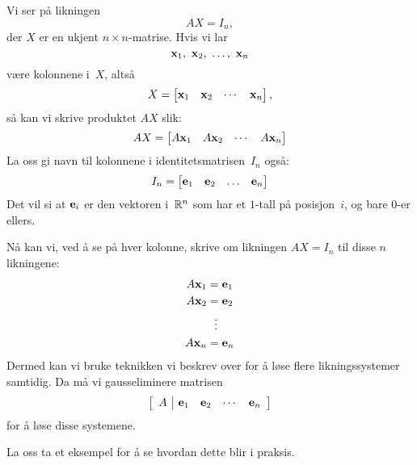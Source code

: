 Vi ser på likningen
\[
AX = I_n,
\]
der $X$ er en ukjent $n \times n$-matrise.  Hvis vi lar
\[
\V{x}_1,\ \V{x}_2,\ \ldots,\ \V{x}_n
\]
være kolonnene i~$X$, altså
\[
X = \begin{bmatrix} \mathbf{x}_1 & \mathbf{x}_2 & \cdots & \mathbf{x}_n \end{bmatrix},
\]
så kan vi skrive produktet $AX$ slik:
\[
AX = \begin{bmatrix} A \mathbf{x}_1 & A \mathbf{x}_2 & \cdots & A \mathbf{x}_n \end{bmatrix}
\]
La oss gi navn til kolonnene i identitetsmatrisen~$I_n$ også:
\[
I_n = \begin{bmatrix} \mathbf{e}_1 & \mathbf{e}_2 & \ldots & \mathbf{e}_n \end{bmatrix}
\]
Det vil si at $\mathbf{e}_i$ er den vektoren i~$\mathbb{R}^n$ som har et $1$-tall
på posisjon~$i$, og bare $0$-er ellers.

Nå kan vi, ved å se på hver kolonne, skrive om likningen $AX = I_n$
til disse $n$ likningene:
\begin{align*}
A \mathbf{x}_1 &= \mathbf{e}_1 \\
A \mathbf{x}_2 &= \mathbf{e}_2 \\
          &\ \ \vdots \\
A \mathbf{x}_n &= \mathbf{e}_n
\end{align*}
Dermed kan vi bruke teknikken vi beskrev over for å løse flere
likningssystemer samtidig.  Da må vi gauss\-eliminere matrisen
\[
\left[
\begin{array}{c|cccc} A & \mathbf{e}_1 & \mathbf{e}_2 & \cdots & \mathbf{e}_n \end{array}
\right]
\]
for å løse disse systemene.

La oss ta et eksempel for å se hvordan dette blir i praksis.

